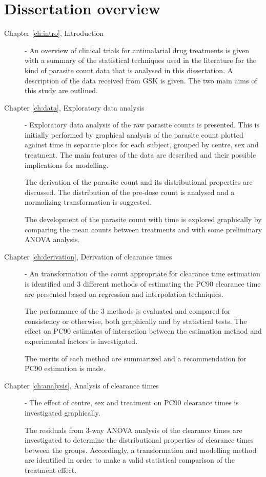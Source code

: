 \section{Dissertation overview}
\begin{description}
\item[Chapter \ref{ch:intro}, Introduction] - An overview of clinical trials for antimalarial drug treatments is given with a summary of the statistical techniques used in the literature for the kind of parasite count data that is analysed in this dissertation. A description of the data received from GSK is given. The two main aims of this study are outlined.
\item[Chapter \ref{ch:data}, Exploratory data analysis] - Exploratory data analysis of the raw parasite counts is presented. This is initially performed by graphical analysis of the parasite count plotted against time in separate plots for each subject, grouped by centre, sex and treatment. The main features of the data are described and their possible implications for modelling.

The derivation of the parasite count and its distributional properties are discussed. The distribution of the pre-dose count is analysed and a normalizing transformation is suggested.

The development of the parasite count with time is explored graphically by comparing the mean counts between treatments and with some preliminary ANOVA analysis.
\item[Chapter \ref{ch:derivation}, Derivation of clearance times] - An transformation of the count appropriate for clearance time estimation is identified and 3 different methods of estimating the PC90 clearance time are presented based on regression and interpolation techniques.

The performance of the 3 methods is evaluated and compared for consistency or otherwise, both graphically and by statistical tests. The effect on PC90 estimates of interaction between the estimation method and experimental factors is investigated.

The merits of each method are summarized and a recommendation for PC90 estimation is made.
\item[Chapter \ref{ch:analysis}, Analysis of clearance times] - The effect of centre, sex and treatment on PC90 clearance times is investigated graphically.

The residuals from 3-way ANOVA analysis of the clearance times are investigated to determine the distributional properties of clearance times between the groups. Accordingly, a transformation and modelling method are identified in order to make a valid statistical comparison of the treatment effect.


\end{description}
